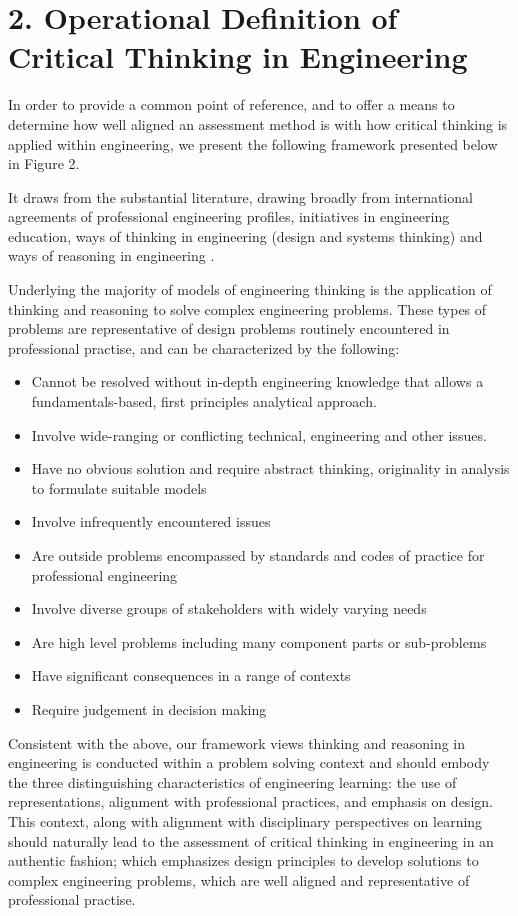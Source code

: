 \section{2. Operational Definition of Critical Thinking in Engineering}

In order to provide a common point of reference, and to offer a means to determine how well aligned an assessment method is with how critical thinking is applied within engineering, we present the following framework presented below in Figure 2.

It draws from the substantial literature, drawing broadly from international agreements of professional engineering profiles\cite{internationalengineeringalliance}, initiatives in engineering education\cite{crawley2011cdio}, ways of thinking in engineering (design and systems thinking) \cite{Dorst:2010tc, Dym:2005gy, Frank:2001ut}and ways of reasoning in engineering \cite{Stein:2011hr, Paul:2006kv}. 

Underlying the majority of models of engineering thinking is the application of thinking and reasoning to solve complex engineering problems. These types of problems are representative of design problems routinely encountered in professional practise, and can be characterized by the following\cite{internationalengineeringalliance}: 

\begin{itemize}
\item Cannot be resolved without in-depth engineering knowledge that allows a fundamentals-based, first principles analytical approach.
\item Involve wide-ranging or conflicting technical, engineering and other issues.
\item Have no obvious solution and require abstract thinking, originality in analysis to formulate suitable models
\item Involve infrequently encountered issues
\item Are outside problems encompassed by standards and codes of practice for professional engineering
\item Involve diverse groups of stakeholders with widely varying needs
\item Are high level problems including many component parts or sub-problems
\item Have significant consequences in a range of contexts
\item Require judgement in decision making
\end{itemize}

Consistent with the above, our framework views thinking and reasoning in engineering is conducted within a problem solving context and should embody the three distinguishing characteristics of engineering learning: the use of representations, alignment with professional practices, and emphasis on design\cite{Johri:2014tk}. This context, along with alignment with disciplinary perspectives on learning should naturally lead to the assessment of critical thinking in engineering in an authentic fashion; which emphasizes design principles to develop solutions to  complex engineering problems, which are well aligned and representative of professional practise.

